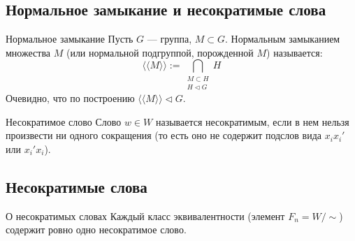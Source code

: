 \subsection{Нормальное замыкание и несократимые слова}

\begin{Definition}{Нормальное замыкание}{}
	Пусть $G$ — группа, $M \subset G$. Нормальным замыканием множества $M$ (или нормальной подгруппой, порожденной $M$) называется:
	\[ \langle\langle M \rangle\rangle := \bigcap_{\substack{M \subset H \\ H \triangleleft G}} H \]
	Очевидно, что по построению $\langle\langle M \rangle\rangle \triangleleft G$.
\end{Definition}

\begin{Definition}{Несократимое слово}{}
	Слово $w \in W$ называется несократимым, если в нем нельзя произвести ни одного сокращения (то есть оно не содержит подслов вида $x_i x_i'$ или $x_i' x_i$).
\end{Definition}

\subsection{Несократимые слова}

\begin{Proposition}{О несократимых словах}{}
	Каждый класс эквивалентности (элемент $F_n = W / \sim$) содержит ровно одно несократимое слово.
\end{Proposition}

